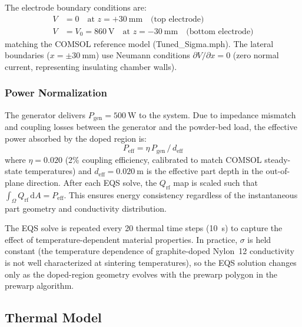 \documentclass[5p,times]{elsarticle}
\newcommand{\Qrf}{Q_{\mathrm{rf}}}
\begin{document}
The electrode boundary conditions are:
\begin{align}
  V &= 0 \quad \text{at } z = +\SI{30}{\milli\meter} \quad
       \text{(top electrode)} \label{eq:bc_top}\\
  V &= V_0 = \SI{860}{\volt} \quad \text{at } z = -\SI{30}{\milli\meter}
       \quad \text{(bottom electrode)} \label{eq:bc_bot}
\end{align}
matching the COMSOL reference model (Tuned\_Sigma.mph).  The lateral
boundaries ($x = \pm\SI{30}{\milli\meter}$) use Neumann conditions
$\partial V/\partial x = 0$ (zero normal current, representing
insulating chamber walls).

\subsubsection{Power Normalization}

The generator delivers $P_{\mathrm{gen}} = \SI{500}{\watt}$ to the
system.  Due to impedance mismatch and coupling losses between the
generator and the powder-bed load, the effective power absorbed by the
doped region is:
\begin{equation}
  P_{\mathrm{eff}} = \eta\,P_{\mathrm{gen}}\,/\,d_{\mathrm{eff}}
  \label{eq:power_eff}
\end{equation}
where $\eta = 0.020$ (2\% coupling efficiency, calibrated to match
COMSOL steady-state temperatures) and $d_{\mathrm{eff}} =
\SI{0.020}{\meter}$ is the effective part depth in the out-of-plane
direction.  After each EQS solve, the $\Qrf$ map is scaled such that
$\int_\Omega \Qrf\,\mathrm{d}A = P_{\mathrm{eff}}$.  This ensures
energy consistency regardless of the instantaneous part geometry and
conductivity distribution.

The EQS solve is repeated every 20 thermal time steps (\SI{10}{\second})
to capture the effect of temperature-dependent material properties.
In practice, $\sigma$ is held constant (the temperature dependence
of graphite-doped Nylon~12 conductivity is not well characterized at
sintering temperatures), so the EQS solution changes only as the
doped-region geometry evolves with the prewarp polygon in the prewarp
algorithm.

\subsection{Thermal Model}
\label{sec:thermal_model}
\end{document}
